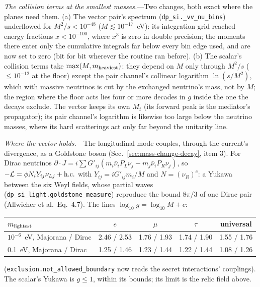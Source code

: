 \documentclass[11pt,a4paper]{article}
\begin{document}
\textit{The collision terms at the smallest masses.}---Two changes, both exact where the planes need them. (a) The
vector pair's spectrum (\texttt{dp\_si.\_vv\_nu\_bins}) underflowed for $M^2/s < 10^{-48}$ ($M \lesssim 10^{-17}$~eV):
its integration grid reached energy fractions $x < 10^{-100}$, where $x^3$ is zero in double precision; the moments
there enter only the cumulative integrals far below every bin edge used, and are now set to zero (bit for bit wherever
the routine ran before). (b) The scalar's collision terms take $\max(M, m_{\rm heaviest})$: they depend on $M$ only
through $M^2/s$ ($\le10^{-12}$ at the floor) except the pair channel's collinear logarithm $\ln(s/M^2)$, which with
massive neutrinos is cut by the exchanged neutrino's mass, not by $M$; the region where the floor acts lies four or
more decades in $g$ inside the one the decays exclude. The vector keeps its own $M_t$ (its forward peak is the
mediator's propagator); its pair channel's logarithm is likewise too large below the neutrino masses, where its hard
scatterings act only far beyond the unitarity line.

\textit{Where the vector holds.}---The longitudinal mode couples, through the current's divergence, as a Goldstone boson
(Sec.~\ref{sec:mass-change-decay}, item 3). For Dirac neutrinos $\partial\cdot J = i\sum G'_{ij}(m_i\bar\nu_iP_L\nu_j -
m_j\bar\nu_iP_R\nu_j)$, so $-\mathcal{L} = \phi N_iY_{ij}\nu_{Lj} + {\rm h.c.}$ with $Y_{ij} = iG'_{ij}m_i/M$ and
$N = (\nu_R)^c$: a Yukawa between the six Weyl fields, whose partial waves (\texttt{dp\_si\_light.goldstone\_measure})
reproduce the bound $8\pi/3$ of one Dirac pair (Allwicher et al.\ Eq.~4.7). The lines $\log_{10}g = \log_{10}M + c$:
\begin{center}
\begin{tabular}{lcccc}
$m_{\rm lightest}$ & $e$ & $\mu$ & $\tau$ & universal \\ \hline
$10^{-6}$~eV, Majorana / Dirac & 2.46 / 2.53 & 1.76 / 1.93 & 1.74 / 1.90 & 1.55 / 1.76 \\
0.1~eV, Majorana / Dirac & 1.25 / 1.46 & 1.23 / 1.44 & 1.22 / 1.44 & 1.08 / 1.26 \\
\end{tabular}
\end{center}
(\texttt{exclusion.not\_allowed\_boundary} now reads the secret interactions' couplings). The scalar's Yukawa is $g\le1$,
within its bounds; its limit is the relic field above.
\end{document}
